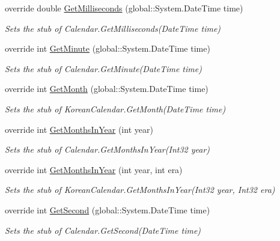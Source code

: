 \begin{DoxyCompactItemize}
override double \hyperlink{class_system_1_1_globalization_1_1_fakes_1_1_stub_korean_calendar_a76f2dd6b755499c705f550ef5202fe95}{Get\-Milliseconds} (global\-::\-System.\-Date\-Time time)
\begin{DoxyCompactList}\small\item\em Sets the stub of Calendar.\-Get\-Milliseconds(\-Date\-Time time)\end{DoxyCompactList}\item 
override int \hyperlink{class_system_1_1_globalization_1_1_fakes_1_1_stub_korean_calendar_a1da965fd906747f59b8a75c775aa8c25}{Get\-Minute} (global\-::\-System.\-Date\-Time time)
\begin{DoxyCompactList}\small\item\em Sets the stub of Calendar.\-Get\-Minute(\-Date\-Time time)\end{DoxyCompactList}\item 
override int \hyperlink{class_system_1_1_globalization_1_1_fakes_1_1_stub_korean_calendar_afeab48e6e05d9b2c5801f364179f4be1}{Get\-Month} (global\-::\-System.\-Date\-Time time)
\begin{DoxyCompactList}\small\item\em Sets the stub of Korean\-Calendar.\-Get\-Month(\-Date\-Time time)\end{DoxyCompactList}\item 
override int \hyperlink{class_system_1_1_globalization_1_1_fakes_1_1_stub_korean_calendar_a9cc18bb5b10753b829cc1fae3bd01523}{Get\-Months\-In\-Year} (int year)
\begin{DoxyCompactList}\small\item\em Sets the stub of Calendar.\-Get\-Months\-In\-Year(\-Int32 year)\end{DoxyCompactList}\item 
override int \hyperlink{class_system_1_1_globalization_1_1_fakes_1_1_stub_korean_calendar_a1cc4153a6fc08662a259367a1c4583a6}{Get\-Months\-In\-Year} (int year, int era)
\begin{DoxyCompactList}\small\item\em Sets the stub of Korean\-Calendar.\-Get\-Months\-In\-Year(\-Int32 year, Int32 era)\end{DoxyCompactList}\item 
override int \hyperlink{class_system_1_1_globalization_1_1_fakes_1_1_stub_korean_calendar_a16ee4e910225108fb330c37bc8ed58cf}{Get\-Second} (global\-::\-System.\-Date\-Time time)
\begin{DoxyCompactList}\small\item\em Sets the stub of Calendar.\-Get\-Second(\-Date\-Time time)\end{DoxyCompactList}\item 

\end{DoxyCompactItemize}
